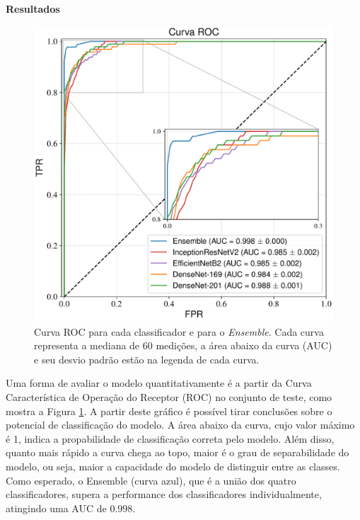 \documentclass[10pt, a4paper, twocolumn]{article}
\begin{document}



\begin{center}
  \bf\fontsize{13}{15.6}\selectfont Resultados
\end{center}

\begin{figure}[!b]
  \includegraphics[width=\linewidth]{figures/roc_mn170_pt.pdf}
  \caption{Curva ROC para cada classificador e para o \emph{Ensemble}. Cada curva representa a mediana de 60 medições, a área abaixo da curva (AUC) e seu desvio padrão estão na legenda de cada curva.}
  \label{fig:roc}
\end{figure}

Uma forma de avaliar o modelo quantitativamente é a partir da Curva Característica de Operação do Receptor (ROC) no conjunto de teste, como mostra a Figura \ref{fig:roc}. A partir deste gráfico é possível tirar conclusões sobre o potencial de classificação do modelo. A área abaixo da curva, cujo valor máximo é 1, indica a propabilidade de classificação correta pelo modelo. Além disso, quanto mais rápido a curva chega ao topo, maior é o grau de separabilidade do modelo, ou seja, maior a capacidade do modelo de distinguir entre as classes. Como esperado, o Ensemble (curva azul), que é a união dos quatro classificadores, supera a performance dos classificadores individualmente, atingindo uma AUC de 0.998.
\end{document}
